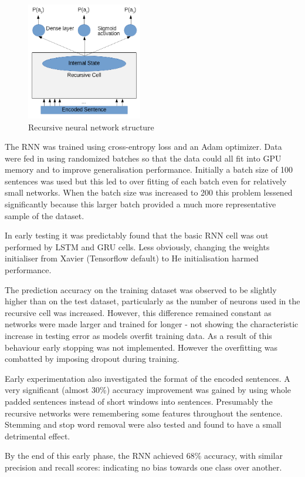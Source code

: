   \begin{figure}[ht]
    \includegraphics[width=0.45\textwidth]{Figures/rnn.png}
    \caption{Recursive neural network structure}
    \label{fig:rnn-structure}
  \end{figure}
  
    The RNN was trained using cross-entropy loss and an Adam optimizer. Data
    were fed in using randomized batches so that the data could all fit into GPU
    memory and to improve generalisation performance. Initially a batch size of
    100 sentences was used but this led to over fitting of each batch even for
    relatively small networks. When the batch size was increased to 200 this
    problem lessened significantly because this larger batch provided a much
    more representative sample of the dataset. 
    
    In early testing it was predictably found that the basic RNN cell was out
    performed by LSTM and GRU cells. Less obviously, changing the weights
    initialiser from Xavier (Tensorflow default) to He initialisation harmed
    performance. 
    
    The prediction accuracy on the training dataset was observed to be slightly
    higher than on the test dataset, particularly as the number of neurons used
    in the recursive cell was increased. However, this difference remained
    constant as networks were made larger and trained for longer - not showing
    the characteristic increase in testing error as models overfit training
    data. As a result of this behaviour early stopping was not implemented.
    However the overfitting was combatted by imposing dropout during training.  
    
    Early experimentation also investigated the format of the encoded sentences.
    A very significant (almost 30\%) accuracy improvement was gained by using
    whole padded sentences instead of short windows into sentences. Presumably
    the recursive networks were remembering some features throughout the
    sentence. Stemming and stop word removal were also tested and found to have
    a small detrimental effect. 
    
    By the end of this early phase, the RNN achieved 68\% accuracy, with similar
    precision and recall scores: indicating no bias towards one class over
    another. 
    
   
